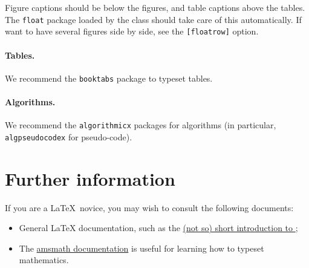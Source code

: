 \documentclass{iacrcc}
\begin{document}
Figure captions should be below the figures, and table captions above
the tables.  The \texttt{float} package loaded by the class should
take care of this automatically.  If want to have several figures side
by side, see the \texttt{[floatrow]} option.

\paragraph{Tables.}

We recommend the \texttt{booktabs} package to typeset tables.

\paragraph{Algorithms.}

We recommend the \texttt{algorithmicx} packages for algorithms (in
particular, \texttt{algpseudocodex} for pseudo-code).


\section{Further information}

If you are a \LaTeX\ novice, you may wish to consult the following documents:
\begin{itemize}
\item General \LaTeX{} documentation, such as the
  \href{http://mirrors.ctan.org/info/lshort/english/lshort.pdf}{(not
    so) short introduction to \LaTeXe};
\item The
  \href{https://mirror.mwt.me/ctan/macros/latex/required/amsmath/amsldoc.pdf}{amsmath
    documentation} is useful for learning how to typeset mathematics.
\end{itemize}

\renewcommand{\refname}{Sample References}

\end{document}
